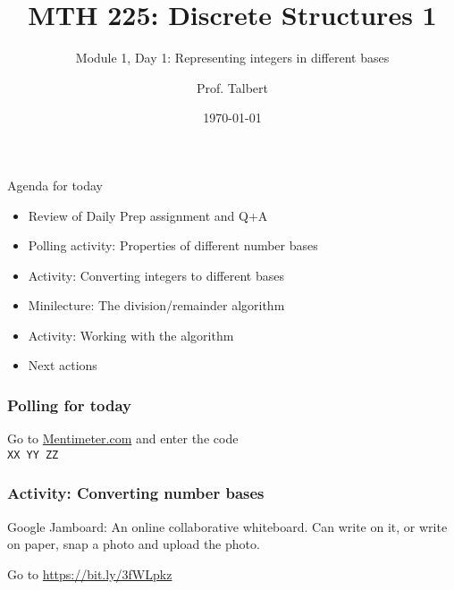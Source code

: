 \documentclass{beamer}
\title{MTH 225: Discrete Structures 1}
\subtitle{Module 1, Day 1: Representing integers in different bases}
\author{Prof. Talbert}
\institute{GVSU}
\date{\today}
\begin{document}
\frame{\titlepage}


\begin{frame}{Agenda for today}
    \begin{itemize}
        \item<1-> Review of Daily Prep assignment and Q+A
        \item<2-> Polling activity: Properties of different number bases
        \item<3-> Activity: Converting integers to different bases
        \item<4-> Minilecture: The division/remainder algorithm
        \item<5-> Activity: Working with the algorithm
        \item<6-> Next actions 
    \end{itemize}
\end{frame}

\begin{frame}
    \frametitle{Polling for today}
    \begin{Large}
        \begin{center}
            Go to \url{Mentimeter.com} and enter the code \\ 
            \texttt{XX YY ZZ} 
        \end{center}   
    \end{Large}
\end{frame}

\begin{frame}
    \frametitle{Activity: Converting number bases}

Google Jamboard: An online collaborative whiteboard. Can write on it, or write on paper, snap a photo and upload the photo. 

    \begin{Large}
        \begin{center}
            Go to \url{https://bit.ly/3fWLpkz}
        \end{center}   
    \end{Large}

\end{frame}
\end{document}
